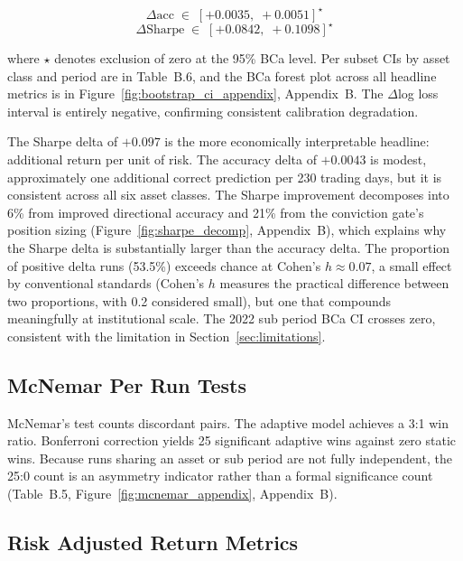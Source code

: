 \begin{equation}
  \Delta\text{acc} \;\in\; [{+}0.0035,\; {+}0.0051]^{\star}
  \label{eq:bca_acc}
\end{equation}
\begin{equation}
  \Delta\text{Sharpe} \;\in\; [{+}0.0842,\; {+}0.1098]^{\star}
  \label{eq:bca_sharpe}
\end{equation}

where $\star$ denotes exclusion of zero at the 95\% BCa level. Per subset CIs by asset class and period are in Table~B.6, and the BCa forest plot across all headline metrics is in Figure~\ref{fig:bootstrap_ci_appendix}, Appendix~B. The $\Delta$log loss interval is entirely negative, confirming consistent calibration degradation.

The Sharpe delta of $+0.097$ is the more economically interpretable headline: additional return per unit of risk. The accuracy delta of $+0.0043$ is modest, approximately one additional correct prediction per 230 trading days, but it is consistent across all six asset classes. The Sharpe improvement decomposes into 6\% from improved directional accuracy and 21\% from the conviction gate's position sizing (Figure~\ref{fig:sharpe_decomp}, Appendix~B), which explains why the Sharpe delta is substantially larger than the accuracy delta. The proportion of positive delta runs (53.5\%) exceeds chance at Cohen's $h \approx 0.07$, a small effect by conventional standards (Cohen's $h$ measures the practical difference between two proportions, with 0.2 considered small), but one that compounds meaningfully at institutional scale. The 2022 sub period BCa CI crosses zero, consistent with the limitation in Section~\ref{sec:limitations}.

\subsection{McNemar Per Run Tests}
\label{subsec:mcnemar}

McNemar's test counts discordant pairs. The adaptive model achieves a 3:1 win ratio. Bonferroni correction yields 25 significant adaptive wins against zero static wins. Because runs sharing an asset or sub period are not fully independent, the 25:0 count is an asymmetry indicator rather than a formal significance count (Table~B.5, Figure~\ref{fig:mcnemar_appendix}, Appendix~B).

\subsection{Risk Adjusted Return Metrics}
\label{subsec:risk_adjusted}

